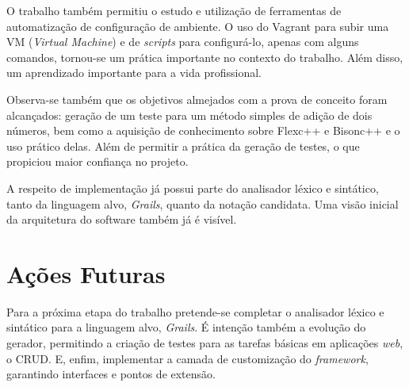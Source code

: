 \par
\indent O trabalho também permitiu o estudo e utilização de ferramentas de automatização de configuração de ambiente. O uso do Vagrant para subir uma VM (\textit{Virtual Machine}) e de \textit{scripts} para configurá-lo, apenas com alguns comandos, tornou-se um prática importante no contexto do trabalho. Além disso, um aprendizado importante para a vida profissional.
\par
\indent Observa-se também que os objetivos almejados com a prova de conceito foram alcançados: geração de um teste para um método simples de adição de dois números, bem como a aquisição de conhecimento sobre Flexc++ e Bisonc++ e o uso prático delas. Além de permitir a prática da geração de testes, o que propiciou maior confiança no projeto.
\par
\indent A respeito de implementação já possui parte do analisador léxico e sintático, tanto da linguagem alvo, \textit{Grails}, quanto da notação candidata. Uma visão inicial da arquitetura do software também já é visível.

\section{Ações Futuras}
Para a próxima etapa do trabalho pretende-se completar o analisador léxico e sintático para a linguagem alvo, \textit{Grails}. É intenção também a evolução do gerador, permitindo a criação de testes para as tarefas básicas em aplicações \textit{web}, o CRUD. E, enfim, implementar a camada de customização do \textit{framework}, garantindo interfaces e pontos de extensão.